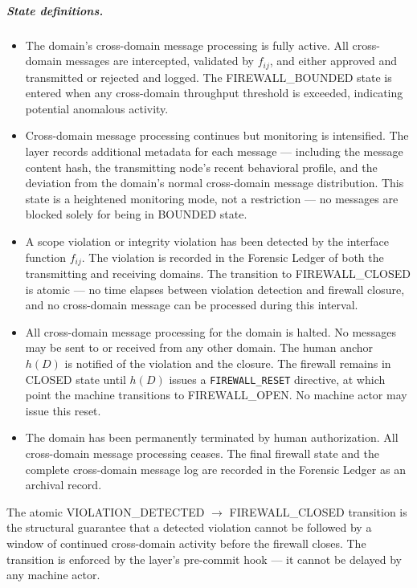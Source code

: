 \subparagraph{State definitions.}

\begin{itemize}\itemsep=0pt
\item[\textbf{FIREWALL\_OPEN.}] The domain's cross-domain message processing is fully active. All cross-domain messages are intercepted, validated by $f_{ij}$, and either approved and transmitted or rejected and logged. The FIREWALL\_BOUNDED state is entered when any cross-domain throughput threshold is exceeded, indicating potential anomalous activity.

\item[\textbf{FIREWALL\_BOUNDED.}] Cross-domain message processing continues but monitoring is intensified. The \fact{} layer records additional metadata for each message — including the message content hash, the transmitting node's recent behavioral profile, and the deviation from the domain's normal cross-domain message distribution. This state is a heightened monitoring mode, not a restriction — no messages are blocked solely for being in BOUNDED state.

\item[\textbf{VIOLATION\_DETECTED.}] A scope violation or integrity violation has been detected by the interface function $f_{ij}$. The violation is recorded in the Forensic Ledger of both the transmitting and receiving domains. The transition to FIREWALL\_CLOSED is atomic — no time elapses between violation detection and firewall closure, and no cross-domain message can be processed during this interval.

\item[\textbf{FIREWALL\_CLOSED.}] All cross-domain message processing for the domain is halted. No messages may be sent to or received from any other domain. The human anchor $h(D)$ is notified of the violation and the closure. The firewall remains in CLOSED state until $h(D)$ issues a \texttt{FIREWALL\_RESET} directive, at which point the machine transitions to FIREWALL\_OPEN. No machine actor may issue this reset.

\item[\textbf{FIREWALL\_TERMINATED.}] The domain has been permanently terminated by human authorization. All cross-domain message processing ceases. The final firewall state and the complete cross-domain message log are recorded in the Forensic Ledger as an archival record.
\end{itemize}

The atomic VIOLATION\_DETECTED $\rightarrow$ FIREWALL\_CLOSED transition is the structural guarantee that a detected violation cannot be followed by a window of continued cross-domain activity before the firewall closes. The transition is enforced by the \fact{} layer's pre-commit hook — it cannot be delayed by any machine actor.

